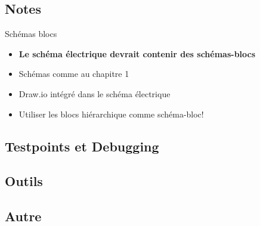 \subsection{Notes}

\begin{frame}{Schémas blocs}
    \begin{itemize}
        \item \textbf{Le schéma électrique devrait contenir des schémas-blocs}
        \item Schémas comme au chapitre 1
        \bigskip
        \item Draw.io intégré dans le schéma électrique
        \item Utiliser les blocs hiérarchique comme schéma-bloc!
    \end{itemize}
\end{frame}



\subsection{Testpoints et Debugging}

\subsection{Outils}

\subsection{Autre}

